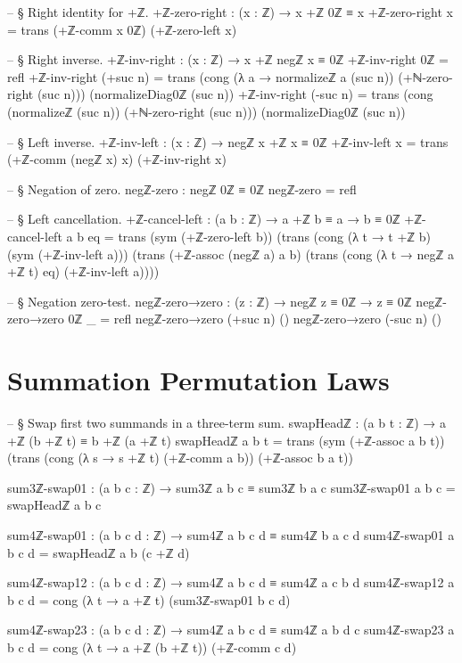 \documentclass[11pt,a4paper]{book}
\begin{document}
\begin{code}
-- § Right identity for +ℤ.
+ℤ-zero-right : (x : ℤ) → x +ℤ 0ℤ ≡ x
+ℤ-zero-right x = trans (+ℤ-comm x 0ℤ) (+ℤ-zero-left x)

-- § Right inverse.
+ℤ-inv-right : (x : ℤ) → x +ℤ negℤ x ≡ 0ℤ
+ℤ-inv-right 0ℤ = refl
+ℤ-inv-right (+suc n) =
  trans
    (cong (λ a → normalizeℤ a (suc n)) (+ℕ-zero-right (suc n)))
    (normalizeDiag0ℤ (suc n))
+ℤ-inv-right (-suc n) =
  trans
    (cong (normalizeℤ (suc n)) (+ℕ-zero-right (suc n)))
    (normalizeDiag0ℤ (suc n))

-- § Left inverse.
+ℤ-inv-left : (x : ℤ) → negℤ x +ℤ x ≡ 0ℤ
+ℤ-inv-left x = trans (+ℤ-comm (negℤ x) x) (+ℤ-inv-right x)

-- § Negation of zero.
negℤ-zero : negℤ 0ℤ ≡ 0ℤ
negℤ-zero = refl

-- § Left cancellation.
+ℤ-cancel-left : (a b : ℤ) → a +ℤ b ≡ a → b ≡ 0ℤ
+ℤ-cancel-left a b eq =
  trans
    (sym (+ℤ-zero-left b))
    (trans
      (cong (λ t → t +ℤ b) (sym (+ℤ-inv-left a)))
      (trans
        (+ℤ-assoc (negℤ a) a b)
        (trans
          (cong (λ t → negℤ a +ℤ t) eq)
          (+ℤ-inv-left a))))

-- § Negation zero-test.
negℤ-zero→zero : (z : ℤ) → negℤ z ≡ 0ℤ → z ≡ 0ℤ
negℤ-zero→zero 0ℤ _ = refl
negℤ-zero→zero (+suc n) ()
negℤ-zero→zero (-suc n) ()
\end{code}

\section{Summation Permutation Laws}

\begin{code}
-- § Swap first two summands in a three-term sum.
swapHeadℤ : (a b t : ℤ) → a +ℤ (b +ℤ t) ≡ b +ℤ (a +ℤ t)
swapHeadℤ a b t =
  trans (sym (+ℤ-assoc a b t))
        (trans (cong (λ s → s +ℤ t) (+ℤ-comm a b))
               (+ℤ-assoc b a t))

sum3ℤ-swap01 : (a b c : ℤ) → sum3ℤ a b c ≡ sum3ℤ b a c
sum3ℤ-swap01 a b c = swapHeadℤ a b c

sum4ℤ-swap01 : (a b c d : ℤ) → sum4ℤ a b c d ≡ sum4ℤ b a c d
sum4ℤ-swap01 a b c d = swapHeadℤ a b (c +ℤ d)

sum4ℤ-swap12 : (a b c d : ℤ) → sum4ℤ a b c d ≡ sum4ℤ a c b d
sum4ℤ-swap12 a b c d = cong (λ t → a +ℤ t) (sum3ℤ-swap01 b c d)

sum4ℤ-swap23 : (a b c d : ℤ) → sum4ℤ a b c d ≡ sum4ℤ a b d c
sum4ℤ-swap23 a b c d = cong (λ t → a +ℤ (b +ℤ t)) (+ℤ-comm c d)
\end{code}
\end{document}

